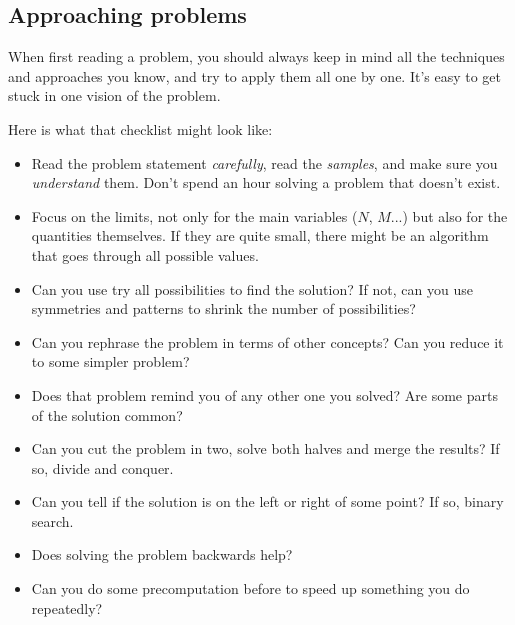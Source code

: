 \subsection{Approaching problems}

When first reading a problem, you should always keep in mind
all the techniques and approaches you know,
and try to apply them all one by one.
It's easy to get stuck in one vision of the problem.

Here is what that checklist might look like:
\begin{itemize}
    \item Read the problem statement \emph{carefully},
        read the \emph{samples}, and make sure you \emph{understand} them.
        Don't spend an hour solving a problem that doesn't exist.
    \item Focus on the limits, not only for the main variables ($N$, $M$...)
        but also for the quantities themselves.
        If they are quite small, there might be
        an algorithm that goes through all possible values.
    \item Can you use try all possibilities to find the solution?
        If not, can you use symmetries and patterns to shrink the number
        of possibilities?
    \item Can you rephrase the problem in terms of other concepts?
        Can you reduce it to some simpler problem?
    \item Does that problem remind you of any other one you solved? Are some
        parts of the solution common?
    \item Can you cut the problem in two, solve both halves and merge the
        results? If so, divide and conquer.
    \item Can you tell if the solution is on the left or right of some point?
        If so, binary search.
    \item Does solving the problem backwards help?
    \item Can you do some precomputation before to speed up something you do
        repeatedly?
\end{itemize}
